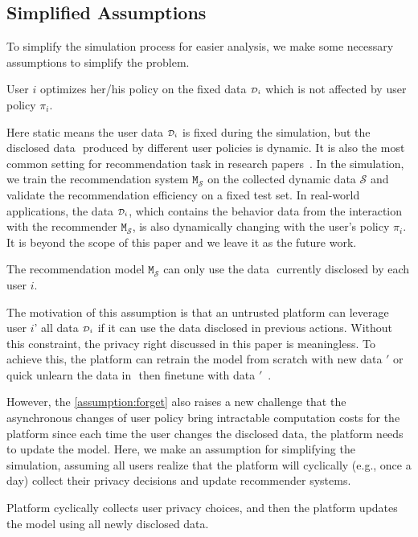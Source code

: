 \subsection{Simplified Assumptions}
\label{assumptions}

To simplify the simulation process for easier analysis, we make some necessary assumptions to simplify the problem.

\begin{assumption} User $i$ optimizes her/his policy on the fixed data ${\scriptstyle \mathcal{D}_i}$ which is not affected by user policy $\pi_i$.
\label{assumption:static}
\end{assumption}

Here static means the user data ${\scriptstyle \mathcal{D}_i}$ is fixed during the simulation, but the disclosed data $\si{}$ produced by different user policies is dynamic. 
It is also the most common setting for recommendation task in research papers~\cite{Rendle:www10:Factorizing,Hidasi:ICLR2016:gru4rec,NCF,kang2018self,Sun:cikm19:BERT4Rec}.
In the simulation, we train the recommendation system $\texttt{M}_{{\scriptscriptstyle \mathcal{S}}}$ on the collected dynamic data $\mathcal{S}$ and validate the recommendation efficiency on a fixed test set. 
In real-world applications, the data ${\scriptstyle \mathcal{D}_i}$, which contains the behavior data from the interaction with the recommender $\texttt{M}_{{\scriptscriptstyle \mathcal{S}}}$, is also dynamically changing with the user's policy $\pi_i$.
It is beyond the scope of this paper and we leave it as the future work. 


\begin{assumption} The recommendation model $\texttt{M}_{{\scriptscriptstyle \mathcal{S}}}$ can only use the data $\si{}$ currently disclosed by each user $i$.
\label{assumption:forget}
\end{assumption}
The motivation of this assumption is that an untrusted platform can leverage user $i$' all data ${\scriptstyle \mathcal{D}_i}$ if it can use the data disclosed in previous actions.
Without this constraint, the privacy right discussed in this paper is meaningless.
To achieve this, the platform can retrain the model from scratch with new data $\si{'}$ or quick unlearn the data in $\si{}$ then finetune with data $\si{'}$~\cite{cao2015towards,bourtoule2021machine,chen2022recommendation}.


However, the \cref{assumption:forget} also raises a new challenge that the asynchronous changes of user policy bring intractable computation costs for the platform since each time the user changes the disclosed data, the platform needs to update the model.
Here, we make an assumption for simplifying the simulation, assuming all users realize that the platform will cyclically (e.g., once a day) collect their privacy decisions and update recommender systems.
\begin{assumption}
Platform cyclically collects user privacy choices, and then the platform updates the model using all newly disclosed data. 
\label{assumption:synchronization}
\end{assumption}



